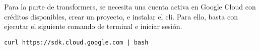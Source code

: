 	Para la parte de transformers, se necesita una cuenta activa en Google Cloud con créditos disponibles, crear un proyecto, e instalar el \gls{cli}. Para ello, basta con ejecutar el siguiente comando de terminal e iniciar sesión. 
	\begin{center}
		\begin{BVerbatim}[tabsize = 0]
			curl https://sdk.cloud.google.com | bash
		\end{BVerbatim}
	\end{center}